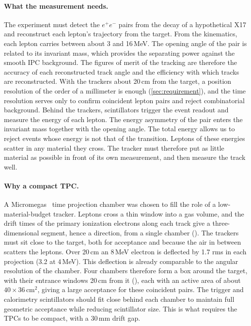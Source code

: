 \paragraph{What the measurement needs.}
The experiment must detect the $e^+e^-$ pairs from the decay of a hypothetical X17 and reconstruct each
lepton's trajectory from the target. From the kinematics, each lepton carries between about 3 and 16\,MeV. The
opening angle of the pair is related to its invariant mass, which provides the separating power against the smooth
IPC background. The figures of merit of the tracking are therefore the accuracy of each reconstructed track angle and the efficiency with which tracks are reconstructed.
With the trackers about 20\,cm from the target, a position resolution of the order of a millimeter is enough (\cref{sec:requirement}), and the time
resolution serves only to confirm coincident lepton pairs and reject combinatorial background. Behind the trackers, scintillators trigger the event readout and measure the energy of each lepton. The energy asymmetry
of the pair enters the invariant mass together with the opening angle. The total energy allows us to reject events whose energy is not that of the transition. Leptons of these energies scatter in any material they cross. The tracker must therefore
put as little material as possible in front of its own measurement, and then measure the track well.

\paragraph{Why a compact TPC.}
A Micromegas~\cite{Giomataris1996} time projection chamber was chosen to fill the role of a low-material-budget
tracker. Leptons cross a thin window into a gas volume, and the drift times of the primary ionization electrons along each track give
a three-dimensional segment, hence a direction, from a single chamber (). The trackers must sit
close to the target, both for acceptance and because the air in between scatters the leptons. Over 20\,cm an 8\,MeV electron is deflected by
1.7\textdegree{} rms in each projection (3.2\textdegree{} at 4\,MeV). This deflection is already comparable to the angular
resolution of the chamber. Four chambers therefore form a box around the target, with their entrance windows 20\,cm from it
(), each with an active area of about $40\times36$\,cm$^2$, giving a large acceptance for these coincident pairs.
The trigger and calorimetry scintillators should fit close behind each chamber to maintain full geometric acceptance while reducing scintillator size. This is what requires the TPCs to be compact, with a 30\,mm drift gap.

